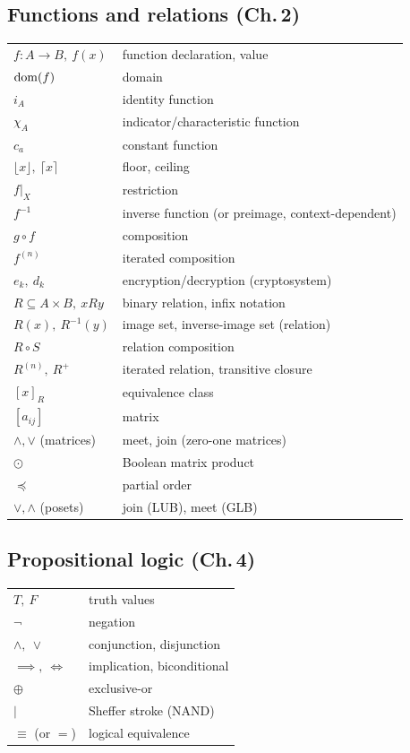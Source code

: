 \documentclass[11pt]{article}
\begin{document}
\subsection*{Functions and relations (Ch.\,2)}
\begin{longtable}{ll}
$f:A\to B,\ f(x)$ & function declaration, value \\
$\operatorname{dom}(f)$ & domain \\
$i_A$ & identity function \\
$\chi_A$ & indicator/characteristic function \\
$c_a$ & constant function \\
$\lfloor x\rfloor,\ \lceil x\rceil$ & floor, ceiling \\
$f|_X$ & restriction \\
$f^{-1}$ & inverse function (or preimage, context-dependent) \\
$g\circ f$ & composition \\
$f^{(n)}$ & iterated composition \\
$e_k,\ d_k$ & encryption/decryption (cryptosystem) \\
$R \subseteq A\times B,\ xRy$ & binary relation, infix notation \\
$R(x),\ R^{-1}(y)$ & image set, inverse-image set (relation) \\
$R\circ S$ & relation composition \\
$R^{(n)},\ R^+$ & iterated relation, transitive closure \\
$[x]_R$ & equivalence class \\
$[a_{ij}]$ & matrix \\
$\wedge,\vee$ (matrices) & meet, join (zero-one matrices) \\
$\odot$ & Boolean matrix product \\
$\preceq$ & partial order \\
$\vee,\wedge$ (posets) & join (LUB), meet (GLB) \\
\end{longtable}

\subsection*{Propositional logic (Ch.\,4)}
\begin{longtable}{ll}
$T,\ F$ & truth values \\
$\neg$ & negation \\
$\wedge,\ \vee$ & conjunction, disjunction \\
$\implies,\ \iff$ & implication, biconditional \\
$\oplus$ & exclusive-or \\
$\mid$ & Sheffer stroke (NAND) \\
$\equiv$ (or $=$) & logical equivalence \\
\end{longtable}
\end{document}
